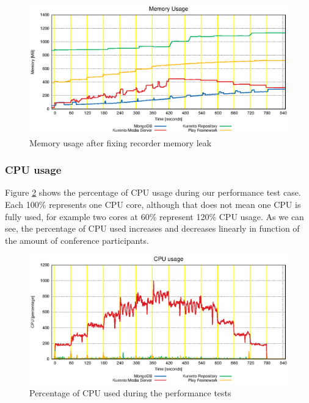 \begin{figure}[!htb]
  \centering
  \includegraphics[width=\textwidth]{stats/test_ram_fixed_mem.eps}
  \caption{Memory usage after fixing recorder memory leak}
  \label{fig:test_ram_fixed_mem}
\end{figure}


\subsubsection{CPU usage}


Figure \ref{fig:test_full_features_cpu} shows the percentage of \ac{CPU} usage during our performance test case. Each 100\% represents one \ac{CPU} core, although that does not mean one \ac{CPU} is fully used, for example two cores at 60\% represent 120\% \ac{CPU} usage. As we can see, the percentage of \ac{CPU} used increases and decreases linearly in function of the amount of conference participants. 

\begin{figure}[!htb]
  \centering
  \includegraphics[width=\textwidth]{stats/test_full_features_cpu.eps}
  \caption{Percentage of CPU used during the performance tests}
  \label{fig:test_full_features_cpu}
\end{figure}

